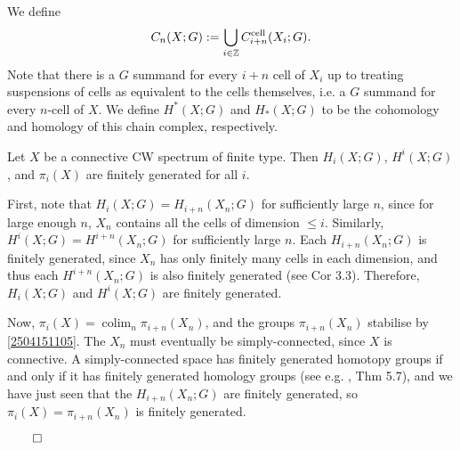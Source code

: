 \documentclass{MetricNotes2023}
\def\subq{\ensuremath\subseteq}
\def\inte{\ensuremath\mathbb{Z}}
\DeclareMathOperator{\colim}{colim}
\def\done{\begin{flushright}\vspace{-4.35ex}\(\qed\)\end{flushright}}
\begin{document}
We define
\[C_n(X ; G):=\bigcup_{i\in \inte}C^\text{cell}_{i+n}(X_i; G).\] 
Note that there is a \(G\) summand for every \(i+n\) cell of \(X_i\) up to treating suspensions of cells as equivalent to the cells themselves, i.e. a \(G\) summand for every \(n\)-cell of \(X\). We define \(H^*(X;G)\) and \(H_*(X;G)\) to be the cohomology and homology of this chain complex, respectively.

\begin{lemma}\label{2504141556}
Let \(X\) be a connective CW spectrum of finite type. Then \(H_i(X;G)\), \(H^i(X;G)\), and \(\pi_i(X)\) are finitely generated for all \(i\). 
\end{lemma}

\begin{ourproof}
First, note that \(H_i(X;G)=H_{i+n}(X_n;G)\) for sufficiently large \(n\), since for large enough \(n\), \(X_n\) contains all the cells of dimension \(\leq i\). Similarly, \(H^i(X;G)=H^{i+n}(X_n;G)\) for sufficiently large \(n\). Each \(H_{i+n}(X_n;G)\) is finitely generated, since \(X_n\) has only finitely many cells in each dimension, and thus each \(H^{i+n}(X_n;G)\) is also finitely generated (see \autocite{hatcher} Cor 3.3). Therefore, \(H_i(X;G)\) and \(H^i(X;G)\) are finitely generated. 

Now, \(\pi_i(X)=\colim_n \pi_{i+n}(X_n)\), and the groups \(\pi_{i+n}(X_n)\) stabilise by \ref{2504151105}. The \(X_n\) must eventually be simply-connected, since \(X\) is connective. %
A simply-connected space has finitely generated homotopy groups if and only if it has finitely generated homology groups (see e.g. \autocite{hatcher}, Thm 5.7), and we have just seen that the \(H_{i+n}(X_n;G)\) are finitely generated, so \(\pi_i(X)=\pi_{i+n}(X_n)\) is finitely generated. \done
\end{ourproof}
\end{document}
